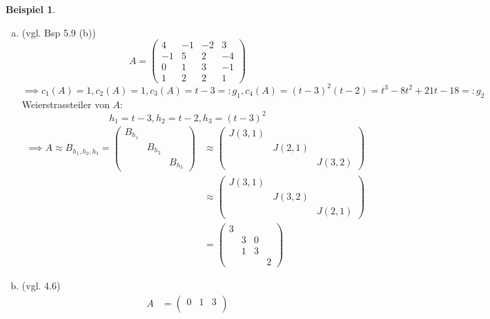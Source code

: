 \documentclass[a4paper, titlepage]{article}
\theoremstyle{definition}
\newtheorem{bsp}[satz]{Beispiel}
\begin{document}
    \begin{bsp}
        \begin{enumerate}[(a)]
            \item (vgl. Bsp 5.9 (b))
            $$ A=\begin{pmatrix}
                4 & -1 & -2 & 3 \\
                -1 & 5 & 2 & -4\\
                0 & 1 & 3 &-1\\
                1 & 2 & 2 & 1 
            \end{pmatrix}$$
            $\implies c_1(A)=1,c_2(A)=1,c_3(A)=t-3=:g_1,c_4(A)=(t-3)^2(t-2)=t^3-8t^2+21t-18=:g_2$
            Weierstrassteiler von $A$: 
            $$h_1=t-3,h_2=t-2,h_3=(t-3)^2$$
            \begin{align*}
                \implies A\approx B_{h_1,h_2,h_3}=\begin{pmatrix}
                    B_{h_1}& & \\
                    & B_{h_2}& \\
                    & &B_{h_3}
                \end{pmatrix} &\approx \begin{pmatrix} 
                    J(3,1)& & \\
                    & J(2,1)& \\
                    & & J(3,2)
                \end{pmatrix}\\
                &\approx \begin{pmatrix} 
                    J(3,1)& & \\
                    & J(3,2)& \\
                    & & J(2,1)
                \end{pmatrix}\\
                &= \begin{pmatrix}
                    3 & & & \\
                    & 3 & 0 &\\
                    & 1& 3 & \\
                    & & & 2
                \end{pmatrix}
            \end{align*}
            \item (vgl. 4.6)
            \begin{align*}
            A&=\begin{pmatrix}
                0 & 1 & 3\\

\end{pmatrix}
\end{align*}
\end{enumerate}
\end{bsp}
\end{document}
